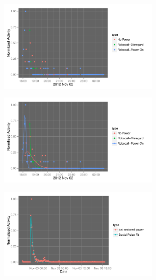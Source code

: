 \documentclass{beamer}
\begin{document}

\begin{frame}
  \begin{center}
    \includegraphics[width=8cm]{./imgs/fake.pdf}
  \end{center}
\end{frame}


\begin{frame}
  \begin{center}
    \includegraphics[width=8cm]{./imgs/fake_fit2.pdf}
  \end{center}
\end{frame}


\begin{frame}
  \begin{center}
    \includegraphics[width=8cm]{./imgs/real_fit.pdf}
  \end{center}
\end{frame}
\end{document}
